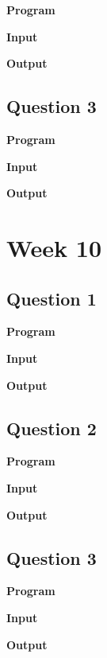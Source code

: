 \documentclass{article}
\begin{document}
\noindent \textbf{\large{Program}}

\newpage
\noindent \textbf{\large{Input}}

\noindent \textbf{\large{Output}}


\newpage
\subsection{Question 3}

\newline 

\noindent \textbf{\large{Program}}

\newpage
\noindent \textbf{\large{Input}}

\noindent \textbf{\large{Output}}

\newpage
\section{Week 10}

\subsection{Question 1}

\newline 

\noindent \textbf{\large{Program}}

\newpage
\noindent \textbf{\large{Input}}

\noindent \textbf{\large{Output}}


\newpage
\subsection{Question 2}

\newline 

\noindent \textbf{\large{Program}}

\newpage
\noindent \textbf{\large{Input}}

\noindent \textbf{\large{Output}}


\newpage
\subsection{Question 3}

\newline 

\noindent \textbf{\large{Program}}

\newpage
\noindent \textbf{\large{Input}}

\noindent \textbf{\large{Output}}

\newpage
\end{document}
